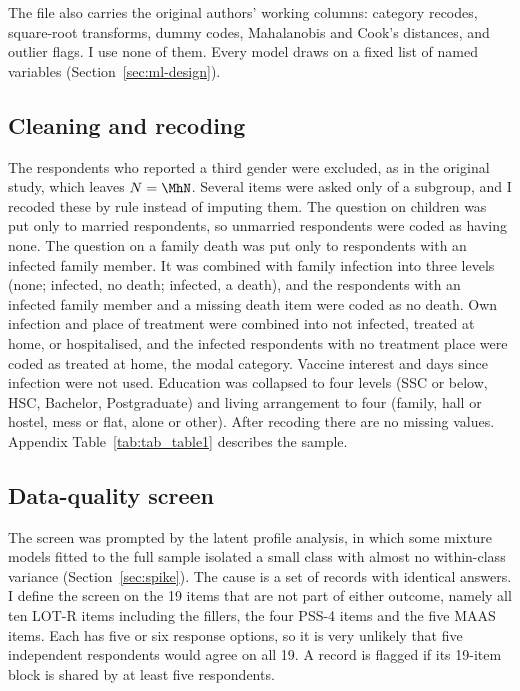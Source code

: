 The file also carries the original authors' working columns: category recodes, square-root transforms, dummy codes, Mahalanobis and Cook's distances, and outlier flags. I use none of them. Every model draws on a fixed list of named variables (Section~\ref{sec:ml-design}).

\subsection{Cleaning and recoding}
The \MhThird{} respondents who reported a third gender were excluded, as in the original study, which leaves $N = \MhN$. Several items were asked only of a subgroup, and I recoded these by rule instead of imputing them. The question on children was put only to married respondents, so unmarried respondents were coded as having none. The question on a family death was put only to respondents with an infected family member. It was combined with family infection into three levels (none; infected, no death; infected, a death), and the \FamDeathMissing{} respondents with an infected family member and a missing death item were coded as no death. Own infection and place of treatment were combined into not infected, treated at home, or hospitalised, and the \TreatMissing{} infected respondents with no treatment place were coded as treated at home, the modal category. Vaccine interest and days since infection were not used. Education was collapsed to four levels (SSC or below, HSC, Bachelor, Postgraduate) and living arrangement to four (family, hall or hostel, mess or flat, alone or other). After recoding there are no missing values. Appendix Table~\ref{tab:tab_table1} describes the sample.

\subsection{Data-quality screen}\label{sec:suspect}
The screen was prompted by the latent profile analysis, in which some mixture models fitted to the full sample isolated a small class with almost no within-class variance (Section~\ref{sec:spike}). The cause is a set of records with identical answers. I define the screen on the 19 items that are not part of either outcome, namely all ten LOT-R items including the fillers, the four PSS-4 items and the five MAAS items. Each has five or six response options, so it is very unlikely that five independent respondents would agree on all 19. A record is flagged if its 19-item block is shared by at least five respondents.

